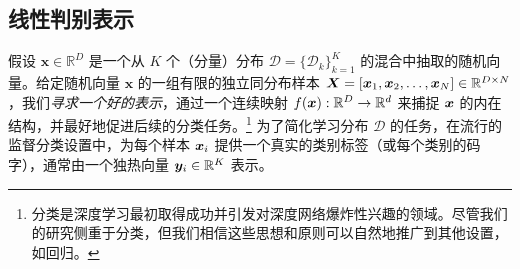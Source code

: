 \documentclass[../../book-main.tex]{subfiles}
\begin{document}





\subsection{线性判别表示}\label{subsec:LDR}

假设 $\bm{x} \in \mathbb{R}^D$ 是一个从 $K$ 个（分量）分布 $\mathcal{D} = \{\mathcal{D}_k\}_{k=1}^K$ 的混合中抽取的随机向量。给定随机向量 $\bm x$ 的一组有限的独立同分布样本 $\bm{X} = [\bm{x}_1, \bm{x}_2, \ldots, \bm{x}_N] \in \mathbb{R}^{D\times N}$，我们{\em 寻求一个好的表示}，通过一个连续映射 $f(\bm{x}): \mathbb{R}^D \rightarrow \mathbb{R}^d$ 来捕捉 $\bm{x}$ 的内在结构，并最好地促进后续的分类任务。\footnote{分类是深度学习最初取得成功并引发对深度网络爆炸性兴趣的领域。尽管我们的研究侧重于分类，但我们相信这些思想和原则可以自然地推广到其他设置，如回归。} 为了简化学习分布 $\mathcal{D}$ 的任务，在流行的监督分类设置中，为每个样本 $\bm{x}_i$ 提供一个真实的类别标签（或每个类别的码字），通常由一个独热向量 $\bm{y}_i \in \mathbb{R}^K$ 表示。

 

\end{document}
